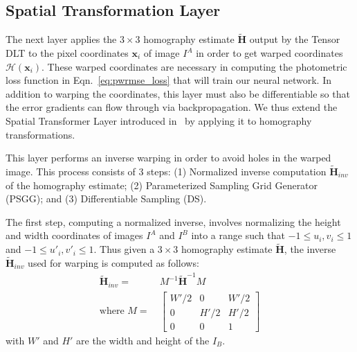 \documentclass[letterpaper, 10 pt, conference]{ieeeconf}
\begin{document}
 






\subsection{Spatial Transformation Layer}
The next layer applies the $3\times 3$ homography estimate $\mathbf{\tilde{H}}$ output by the Tensor DLT to the pixel coordinates $\mathbf{x}_{i}$ of image $I^{A}$ in order to get warped coordinates $\mathcal{H}(\mathbf{x}_{i})$. These warped coordinates are necessary in computing the photometric loss function in Eqn.~\eqref{eq:pwrmse_loss} that will train our neural network. In addition to warping the coordinates, this layer must also be differentiable so that the error gradients can flow through via backpropagation. We thus extend the Spatial Transformer Layer introduced in~\cite{jaderberg2015spatial} by applying it to homography transformations.

This layer performs an inverse warping in order to avoid holes in the warped image. This process consists of 3 steps: (1) Normalized inverse computation $\mathbf{\tilde{H}}_{inv}$ of the homography estimate; (2) Parameterized Sampling Grid Generator (PSGG); and (3) Differentiable Sampling (DS). 

The first step, computing a normalized inverse, involves normalizing the height and width coordinates of images $I^{A}$ and $I^{B}$ into a range such that $-1 \leq u_i, v_i \leq 1$ and $-1 \leq u'_i, v'_i \leq 1$. Thus given a $3 \times 3$ homography estimate $\mathbf{\tilde{H}}$, the inverse $\mathbf{\tilde{H}}_{inv}$ used for warping is computed as follows:
\begin{align*}
\mathbf{\tilde{H}}_{inv} =&\ M^{-1} \mathbf{\tilde{H}}^{-1}  M \\ 
\mbox{where } M = &\ \begin{bmatrix}
               W'/2 & 0 & W'/2 \\
               0     & H'/2 & H'/2 \\ 
               0   &     0      &   1
             \end{bmatrix}
\end{align*}
with $W'$ and $H'$ are the width and height of the $I_{B}$. 
\end{document}
